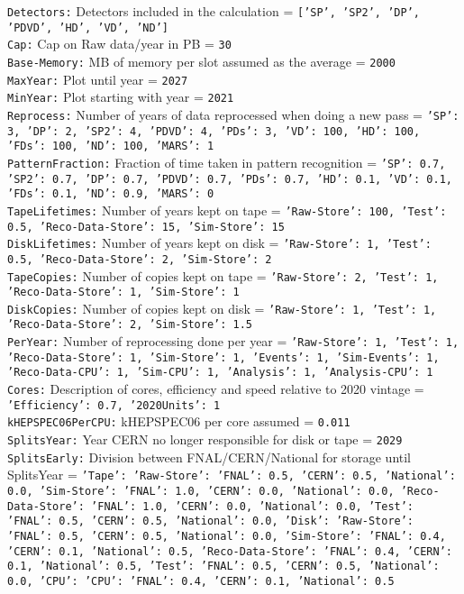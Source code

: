 {\tt Detectors:} Detectors included in the calculation = {\tt ['SP', 'SP2', 'DP', 'PDVD', 'HD', 'VD', 'ND']} \\
{\tt Cap:} Cap on Raw data/year in PB = {\tt 30} \\
{\tt Base-Memory:} MB of memory per slot assumed as the average = {\tt 2000} \\
{\tt MaxYear:} Plot until year = {\tt 2027} \\
{\tt MinYear:} Plot starting with year = {\tt 2021} \\
{\tt Reprocess:} Number of years of data reprocessed when doing a new pass = {\tt {'SP': 3, 'DP': 2, 'SP2': 4, 'PDVD': 4, 'PDs': 3, 'VD': 100, 'HD': 100, 'FDs': 100, 'ND': 100, 'MARS': 1}} \\
{\tt PatternFraction:} Fraction of time taken in pattern recognition = {\tt {'SP': 0.7, 'SP2': 0.7, 'DP': 0.7, 'PDVD': 0.7, 'PDs': 0.7, 'HD': 0.1, 'VD': 0.1, 'FDs': 0.1, 'ND': 0.9, 'MARS': 0}} \\
{\tt TapeLifetimes:} Number of years kept on tape = {\tt {'Raw-Store': 100, 'Test': 0.5, 'Reco-Data-Store': 15, 'Sim-Store': 15}} \\
{\tt DiskLifetimes:} Number of years kept on disk = {\tt {'Raw-Store': 1, 'Test': 0.5, 'Reco-Data-Store': 2, 'Sim-Store': 2}} \\
{\tt TapeCopies:} Number of copies kept on tape = {\tt {'Raw-Store': 2, 'Test': 1, 'Reco-Data-Store': 1, 'Sim-Store': 1}} \\
{\tt DiskCopies:} Number of copies kept on disk = {\tt {'Raw-Store': 1, 'Test': 1, 'Reco-Data-Store': 2, 'Sim-Store': 1.5}} \\
{\tt PerYear:} Number of reprocessing done per year = {\tt {'Raw-Store': 1, 'Test': 1, 'Reco-Data-Store': 1, 'Sim-Store': 1, 'Events': 1, 'Sim-Events': 1, 'Reco-Data-CPU': 1, 'Sim-CPU': 1, 'Analysis': 1, 'Analysis-CPU': 1}} \\
{\tt Cores:} Description of cores, efficiency and speed relative to 2020 vintage = {\tt {'Efficiency': 0.7, '2020Units': 1}} \\
{\tt kHEPSPEC06PerCPU:} kHEPSPEC06 per core assumed = {\tt 0.011} \\
{\tt SplitsYear:} Year CERN no longer responsible for disk or tape = {\tt 2029} \\
{\tt SplitsEarly:} Division between FNAL/CERN/National for storage until SplitsYear = {\tt {'Tape': {'Raw-Store': {'FNAL': 0.5, 'CERN': 0.5, 'National': 0.0}, 'Sim-Store': {'FNAL': 1.0, 'CERN': 0.0, 'National': 0.0}, 'Reco-Data-Store': {'FNAL': 1.0, 'CERN': 0.0, 'National': 0.0}, 'Test': {'FNAL': 0.5, 'CERN': 0.5, 'National': 0.0}}, 'Disk': {'Raw-Store': {'FNAL': 0.5, 'CERN': 0.5, 'National': 0.0}, 'Sim-Store': {'FNAL': 0.4, 'CERN': 0.1, 'National': 0.5}, 'Reco-Data-Store': {'FNAL': 0.4, 'CERN': 0.1, 'National': 0.5}, 'Test': {'FNAL': 0.5, 'CERN': 0.5, 'National': 0.0}}, 'CPU': {'CPU': {'FNAL': 0.4, 'CERN': 0.1, 'National': 0.5}}}} \\
